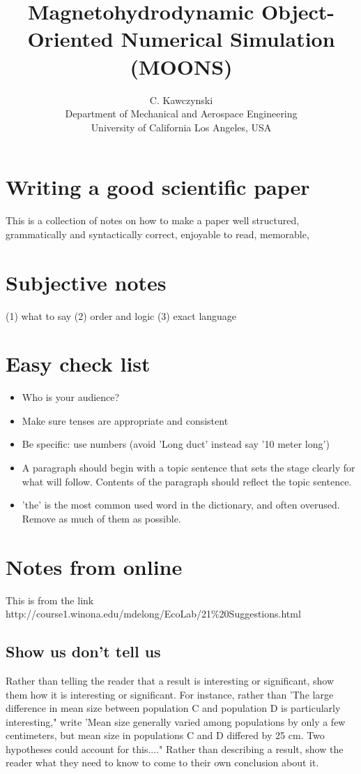\documentclass[11pt]{article}
\begin{document}
\doublespacing
\title{Magnetohydrodynamic Object-Oriented Numerical Simulation (MOONS)}
\author{C. Kawczynski \\
Department of Mechanical and Aerospace Engineering \\
University of California Los Angeles, USA\\}
\maketitle

\section{Writing a good scientific paper}
This is a collection of notes on how to make a paper well structured, grammatically and syntactically correct, enjoyable to read, memorable, 

\section{Subjective notes}
(1) what to say
(2) order and logic
(3) exact language


\section{Easy check list}
\begin{itemize}
\item Who is your audience?
\item Make sure tenses are appropriate and consistent
\item Be specific: use numbers (avoid 'Long duct' instead say '10 meter long')
\item A paragraph should begin with a topic sentence that sets the stage clearly for what will follow. Contents of the paragraph should reflect the topic sentence.
\item 'the' is the most common used word in the dictionary, and often overused. Remove as much of them as possible.
\end{itemize}

\section{Notes from online}
This is from the link
http://course1.winona.edu/mdelong/EcoLab/21\%20Suggestions.html

\subsection{Show us don't tell us}
Rather than telling the reader that a result is interesting or significant, show them how it is interesting or significant. For instance, rather than 'The large difference in mean size between population C and population D is particularly interesting," write 'Mean size generally varied among populations by only a few centimeters, but mean size in populations C and D differed by 25 cm. Two hypotheses could account for this...." Rather than describing a result, show the reader what they need to know to come to their own conclusion about it.
\end{document}
